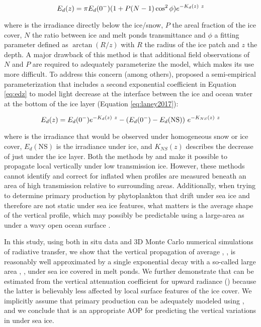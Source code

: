 \begin{equation}
    {E_d(z)}{} = \pi {E_d(0^-)}{} (1 + P(N-1)\cos^2\phi)e^{-K_{d}(z)~z}
    \label{eq:frey2011}
\end{equation}

\noindent where \edzero{} is the irradiance directly below the ice/snow, $P$ the areal fraction of the ice cover, $N$ the ratio between ice and melt ponds transmittance and $\phi$ a fitting parameter defined as $\arctan(R/z)$ with $R$ the radius of the ice patch and $z$ the depth. A major drawback of this method is that additional field observations of $N$ and $P$ are required to adequately parameterize the model, which makes its use more difficult. To address this concern (among others), \citet{Laney2017} proposed a semi-empirical parameterization that includes a second exponential coefficient in Equation \ref{eq:edz} to model light decrease at the interface between the ice and ocean water at the bottom of the ice layer (Equation \ref{eq:laney2017}):

\begin{equation}
    {E_d(z)}{} = {E_d(0^-)}{}e^{-K_{d}(z)~z} - ({E_d(0^-)}{} - E_d(\text{NS}))~e^{-K_{NS}(z)~z}
    \label{eq:laney2017}
\end{equation}

\noindent where \edzero{} is the irradiance that would be observed under homogeneous snow or ice cover, $E_d(\text{NS})$ is the irradiance under ice, and $K_{NS}(z)$ describes the decrease of \edzero{} just under the ice layer. Both the methods by \citet{Frey2011} and \citet{Laney2017} make it possible to propagate local \edz{} vertically under low transmission ice. However, these methods cannot identify and correct for inflated \ked{} when profiles are measured beneath an area of high transmission relative to surrounding areas. Additionally, when trying to determine primary production by phytoplankton that drift under sea ice and therefore are not static under sea ice features, what matters is the average shape of the vertical \edz{} profile, which may possibly be predictable using a large-area \meanked{} as under a wavy open ocean surface \citep{Zaneveld2001}. 

In this study, using both in situ data and 3D Monte Carlo numerical simulations of radiative transfer, we show that the vertical propagation of average \edz{}, \meanedz{}, is reasonably well approximated by a single exponential decay with a so-called large area \ked{}, \meanked{}, under sea ice covered in melt ponds. We further demonstrate that \meanked{} can be estimated from the vertical attenuation coefficient for upward radiance (\klu{}) because the latter is believably less affected by local surface features of the ice cover. We implicitly assume that primary production can be adequately modeled using \meanedz{}, and we conclude that \klu{} is an appropriate AOP for predicting the vertical variations in \meanedz{} under sea ice.